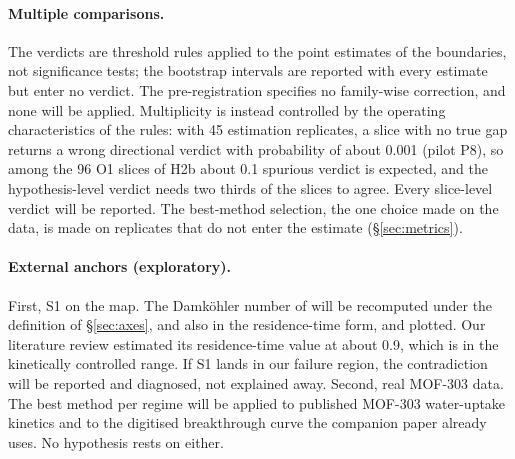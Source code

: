 \documentclass[11pt]{article}
\begin{document}
\paragraph{Multiple comparisons.} The verdicts are threshold rules applied to the point
estimates of the boundaries, not significance tests; the bootstrap intervals are reported
with every estimate but enter no verdict. The pre-registration specifies no family-wise
correction, and none will be applied. Multiplicity is instead controlled by the
operating characteristics of the rules: with 45 estimation replicates, a slice with no true
gap returns a wrong directional verdict with probability of about 0.001 (pilot P8), so
among the 96 O1 slices of H2b about 0.1 spurious verdict is expected, and the
hypothesis-level verdict needs two thirds of the slices to agree. Every slice-level verdict will be
reported. The best-method selection, the one choice made on the data, is made on
replicates that do not enter the estimate (\S\ref{sec:metrics}).

\paragraph{External anchors (exploratory).}
First, S1 on the map. The Damk\"ohler number of \citep{santana2023} will be recomputed
under the definition of \S\ref{sec:axes}, and also in the residence-time form, and plotted.
Our literature review estimated its residence-time value at about 0.9, which is in the
kinetically controlled range. If S1 lands in our failure region, the contradiction will be
reported and diagnosed, not explained away.
Second, real MOF-303 data. The best method per regime will be applied to published
MOF-303 water-uptake kinetics \citep{abuelmaaty2024} and to the digitised breakthrough
curve the companion paper already uses. No hypothesis rests on either.
\end{document}
